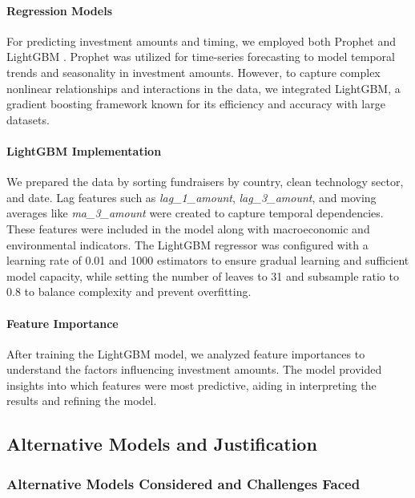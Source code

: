 \documentclass[sigconf]{acmart}
\begin{document}
\paragraph{Regression Models}

For predicting investment amounts and timing, we employed both Prophet \cite{taylor2018forecasting} and LightGBM \cite{ke2017lightgbm}. Prophet was utilized for time-series forecasting to model temporal trends and seasonality in investment amounts. However, to capture complex nonlinear relationships and interactions in the data, we integrated LightGBM, a gradient boosting framework known for its efficiency and accuracy with large datasets.

\paragraph{LightGBM Implementation}

We prepared the data by sorting fundraisers by country, clean technology sector, and date. Lag features such as \textit{lag\_1\_amount}, \textit{lag\_3\_amount}, and moving averages like \textit{ma\_3\_amount} were created to capture temporal dependencies. These features were included in the model along with macroeconomic and environmental indicators. The LightGBM regressor was configured with a learning rate of 0.01 and 1000 estimators to ensure gradual learning and sufficient model capacity, while setting the number of leaves to 31 and subsample ratio to 0.8 to balance complexity and prevent overfitting.

\paragraph{Feature Importance}

After training the LightGBM model, we analyzed feature importances to understand the factors influencing investment amounts. The model provided insights into which features were most predictive, aiding in interpreting the results and refining the model.

\subsection{Alternative Models and Justification}

\subsubsection{Alternative Models Considered and Challenges Faced}
\end{document}
